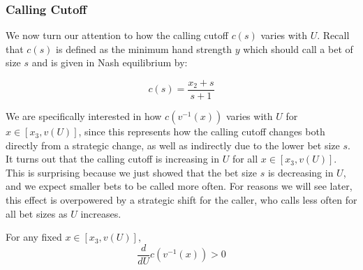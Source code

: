 \documentclass[../../main/main.tex]{subfiles}
\begin{document}
\subsubsection{Calling Cutoff}

We now turn our attention to how the calling cutoff $c(s)$ varies with $U$. Recall that $c(s)$ is defined as the minimum hand strength $y$ which should call a bet of size $s$ and is given in Nash equilibrium by:

$$c(s) = \frac{x_2 + s}{s+1}$$

We are specifically interested in how $c(v^{-1}(x))$ varies with $U$ for $x \in [x_3, v(U)]$, since this represents how the calling cutoff changes both directly from a strategic change, as well as indirectly due to the lower bet size $s$. It turns out that the calling cutoff is increasing in $U$ for all $x \in [x_3, v(U)]$. This is surprising because we just showed that the bet size $s$ is decreasing in $U$, and we expect smaller bets to be called more often. For reasons we will see later, this effect is overpowered by a strategic shift for the caller, who calls less often for all bet sizes as $U$ increases. 

\begin{lemma}
    \label{lem:c_increasing}
    For any fixed $x \in [x_3, v(U)]$, 
    \[ 
        \frac{d}{dU} c(v^{-1}(x)) > 0
    \]
\end{lemma}
\end{document}
